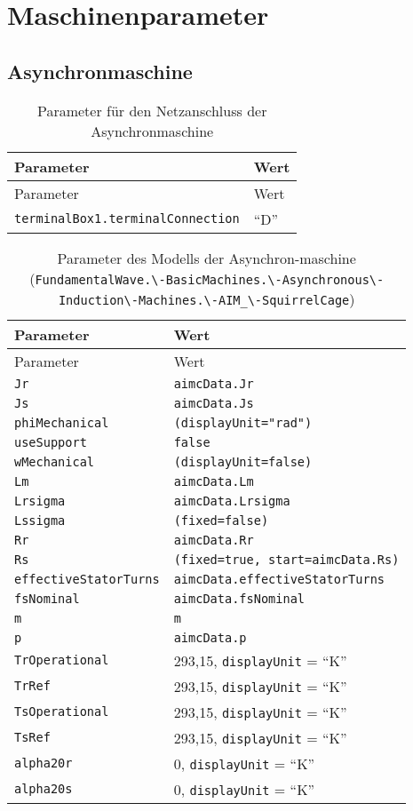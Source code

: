 \hypertarget{maschinenparameter}{%
\section{Maschinenparameter}\label{maschinenparameter}}

\hypertarget{asynchronmaschine}{%
\subsection{Asynchronmaschine}\label{asynchronmaschine}}

\begin{longtable}[]{@{}ll@{}}
\caption{Parameter für den Netzanschluss der
Asynchronmaschine}\tabularnewline
\toprule
Parameter & Wert\tabularnewline
\midrule
\endfirsthead
\toprule
Parameter & Wert\tabularnewline
\midrule
\endhead
\texttt{terminalBox1.terminalConnection} & ``D''\tabularnewline
\bottomrule
\end{longtable}

\begin{longtable}[]{@{}ll@{}}
\caption{Parameter des Modells der Asynchron-maschine
(\texttt{FundamentalWave.\textbackslash{}-BasicMachines.\textbackslash{}-Asynchronous\textbackslash{}-Induction\textbackslash{}-Machines.\textbackslash{}-AIM\_\textbackslash{}-SquirrelCage})}\tabularnewline
\toprule
Parameter & Wert\tabularnewline
\midrule
\endfirsthead
\toprule
Parameter & Wert\tabularnewline
\midrule
\endhead
\texttt{Jr} & \texttt{aimcData.Jr}\tabularnewline
\texttt{Js} & \texttt{aimcData.Js}\tabularnewline
\texttt{phiMechanical} & \texttt{(displayUnit="rad")}\tabularnewline
\texttt{useSupport} & \texttt{false}\tabularnewline
\texttt{wMechanical} & \texttt{(displayUnit=false)}\tabularnewline
\texttt{Lm} & \texttt{aimcData.Lm}\tabularnewline
\texttt{Lrsigma} & \texttt{aimcData.Lrsigma}\tabularnewline
\texttt{Lssigma} & \texttt{(fixed=false)}\tabularnewline
\texttt{Rr} & \texttt{aimcData.Rr}\tabularnewline
\texttt{Rs} & \texttt{(fixed=true,\ start=aimcData.Rs)}\tabularnewline
\texttt{effectiveStatorTurns} &
\texttt{aimcData.effectiveStatorTurns}\tabularnewline
\texttt{fsNominal} & \texttt{aimcData.fsNominal}\tabularnewline
\texttt{m} & \texttt{m}\tabularnewline
\texttt{p} & \texttt{aimcData.p}\tabularnewline
\texttt{TrOperational} & 293,15, \texttt{displayUnit} =
``K''\tabularnewline
\texttt{TrRef} & 293,15, \texttt{displayUnit} = ``K''\tabularnewline
\texttt{TsOperational} & 293,15, \texttt{displayUnit} =
``K''\tabularnewline
\texttt{TsRef} & 293,15, \texttt{displayUnit} = ``K''\tabularnewline
\texttt{alpha20r} & 0, \texttt{displayUnit} = ``K''\tabularnewline
\texttt{alpha20s} & 0, \texttt{displayUnit} = ``K''\tabularnewline
\bottomrule
\end{longtable}

